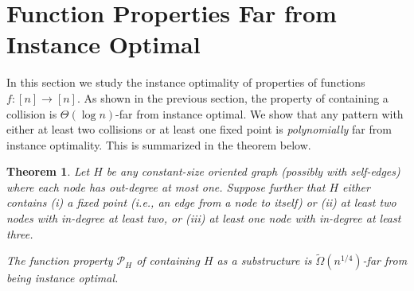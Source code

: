 \documentclass[11pt]{article}
\numberwithin{equation}{section}
\newtheorem{theorem}{Theorem}[section]
\newtheorem{lemma}[lemma]{Lemma}
\renewcommand{\P}{\mathcal{P}}
\newcommand{\1}{\mathbf{1}}
\newcommand{\remove}[1]{}
\begin{document}
\remove{
\begin{lemma}
Assuming the total number of queries made thus far is $o(n^c \log(n))$ (or similar), an algorithm whp won't land twice on the same path. 
\end{lemma}

\begin{lemma}
Assuming the total number of queries made thus far is $o(n^c \log(n))$ (or similar), then learning with (exponentially) high probability whether the correct length is $t$, requires $\omega(n^c)$ queries, all spent on walking path of length ``close" to $t$.  

This is independent of $t$, 
\end{lemma}

To be able to use the above lemma I think we need something stronger. I.e claim that an algorithm that spends $O(\frac{n^c}{\log(n)})$ queries walking paths of length $t$ doesn't learn much (i.e the probability that a path is good is very close to $\frac{1}{\log n}$. I think here is where the $\loglog(n)$ might come in -- an algorithm can learn something meaningful in $O(\frac{n^c}{\log\log(n)})$
}



\section{Function Properties Far from Instance Optimal} \label{sec:4}
In this section we study the instance optimality of properties of functions $f \colon [n] \to [n]$. As shown in the previous section, the property of containing a collision is $\Theta(\log n)$-far from instance optimal. We show that any pattern with either at least two collisions or at least one fixed point is \emph{polynomially} far from instance optimality. This is summarized in the theorem below.

\begin{theorem}
\label{thm:function_charac}
Let $H$ be any constant-size oriented graph (possibly with self-edges) where each node has out-degree at most one. Suppose further that $H$ either contains (i) a fixed point (i.e., an edge from a node to itself) or (ii) at least two nodes with in-degree at least two, or (iii) at least one node with in-degree at least three. 

The function property $\P_H$ of containing $H$ as a substructure is $\tilde\Omega(n^{1/4})$-far from being instance optimal.
\end{theorem}
\end{document}
